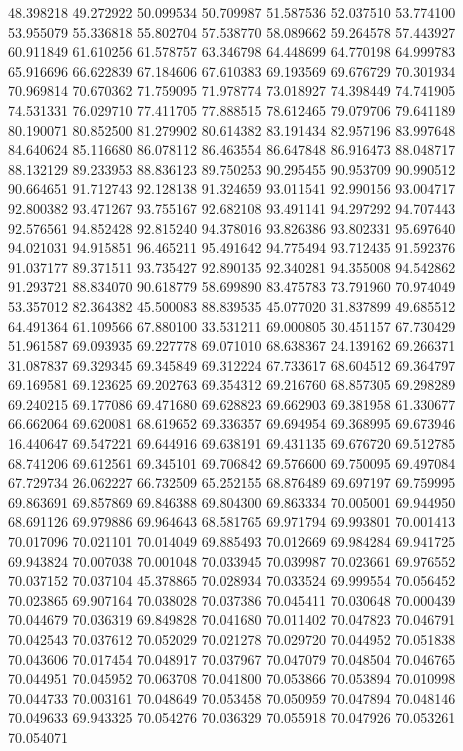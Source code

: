 48.398218
49.272922
50.099534
50.709987
51.587536
52.037510
53.774100
53.955079
55.336818
55.802704
57.538770
58.089662
59.264578
57.443927
60.911849
61.610256
61.578757
63.346798
64.448699
64.770198
64.999783
65.916696
66.622839
67.184606
67.610383
69.193569
69.676729
70.301934
70.969814
70.670362
71.759095
71.978774
73.018927
74.398449
74.741905
74.531331
76.029710
77.411705
77.888515
78.612465
79.079706
79.641189
80.190071
80.852500
81.279902
80.614382
83.191434
82.957196
83.997648
84.640624
85.116680
86.078112
86.463554
86.647848
86.916473
88.048717
88.132129
89.233953
88.836123
89.750253
90.295455
90.953709
90.990512
90.664651
91.712743
92.128138
91.324659
93.011541
92.990156
93.004717
92.800382
93.471267
93.755167
92.682108
93.491141
94.297292
94.707443
92.576561
94.852428
92.815240
94.378016
93.826386
93.802331
95.697640
94.021031
94.915851
96.465211
95.491642
94.775494
93.712435
91.592376
91.037177
89.371511
93.735427
92.890135
92.340281
94.355008
94.542862
91.293721
88.834070
90.618779
58.699890
83.475783
73.791960
70.974049
53.357012
82.364382
45.500083
88.839535
45.077020
31.837899
49.685512
64.491364
61.109566
67.880100
33.531211
69.000805
30.451157
67.730429
51.961587
69.093935
69.227778
69.071010
68.638367
24.139162
69.266371
31.087837
69.329345
69.345849
69.312224
67.733617
68.604512
69.364797
69.169581
69.123625
69.202763
69.354312
69.216760
68.857305
69.298289
69.240215
69.177086
69.471680
69.628823
69.662903
69.381958
61.330677
66.662064
69.620081
68.619652
69.336357
69.694954
69.368995
69.673946
16.440647
69.547221
69.644916
69.638191
69.431135
69.676720
69.512785
68.741206
69.612561
69.345101
69.706842
69.576600
69.750095
69.497084
67.729734
26.062227
66.732509
65.252155
68.876489
69.697197
69.759995
69.863691
69.857869
69.846388
69.804300
69.863334
70.005001
69.944950
68.691126
69.979886
69.964643
68.581765
69.971794
69.993801
70.001413
70.017096
70.021101
70.014049
69.885493
70.012669
69.984284
69.941725
69.943824
70.007038
70.001048
70.033945
70.039987
70.023661
69.976552
70.037152
70.037104
45.378865
70.028934
70.033524
69.999554
70.056452
70.023865
69.907164
70.038028
70.037386
70.045411
70.030648
70.000439
70.044679
70.036319
69.849828
70.041680
70.011402
70.047823
70.046791
70.042543
70.037612
70.052029
70.021278
70.029720
70.044952
70.051838
70.043606
70.017454
70.048917
70.037967
70.047079
70.048504
70.046765
70.044951
70.045952
70.063708
70.041800
70.053866
70.053894
70.010998
70.044733
70.003161
70.048649
70.053458
70.050959
70.047894
70.048146
70.049633
69.943325
70.054276
70.036329
70.055918
70.047926
70.053261
70.054071
